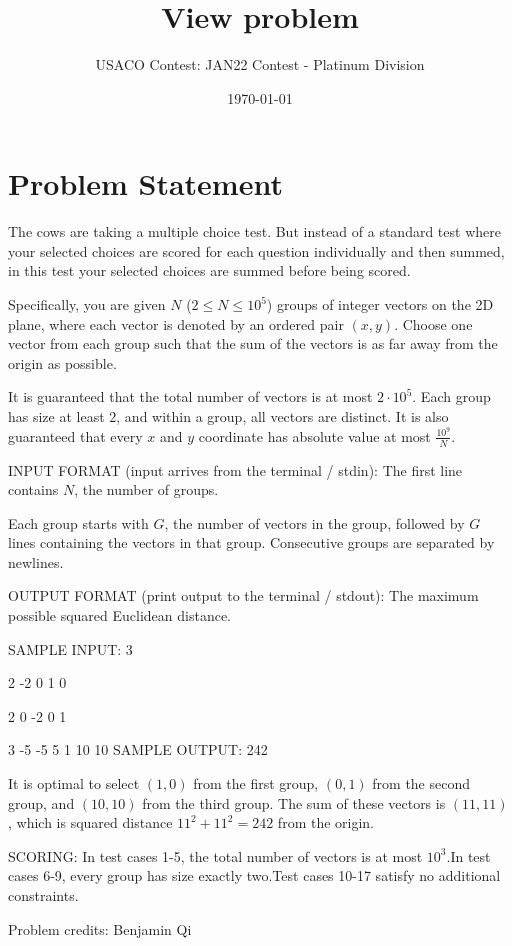 \documentclass[12pt]{article}
\title{View problem}
\author{USACO Contest: JAN22 Contest - Platinum Division}
\date{\today}
\begin{document}
\maketitle

\section*{Problem Statement}

The cows are taking a multiple choice test. But instead of a standard test where your
selected choices are scored for each question individually and then summed, in
this test your selected choices are summed before being scored.

Specifically, you are given $N$ ($2\le N\le 10^5$) groups of integer vectors  on
the 2D plane, where each vector is denoted by an ordered pair $(x,y)$. Choose
one vector from each group such that the sum of the vectors is as far away from
the origin as possible.

It is guaranteed that the total number of vectors is at most $2\cdot 10^5$. 
Each group has size at least $2$, and within a group, all vectors are distinct. 
It is also guaranteed that every $x$ and $y$ coordinate has absolute value at
most $\frac{10^9}{N}$.

INPUT FORMAT (input arrives from the terminal / stdin):
The first line contains $N$, the number of groups.

Each group starts with $G$, the number of vectors in the group, followed by $G$
lines containing the vectors in that group. Consecutive groups are separated by
newlines.

OUTPUT FORMAT (print output to the terminal / stdout):
The maximum possible squared Euclidean distance.

SAMPLE INPUT:
3

2
-2 0
1 0

2
0 -2
0 1

3
-5 -5
5 1
10 10
SAMPLE OUTPUT: 
242

It is optimal to select $(1,0)$ from the first group, $(0,1)$ from the second
group, and $(10,10)$ from the third group. The sum of these vectors is
$(11,11)$, which is squared distance $11^2+11^2=242$ from the origin.

SCORING:
In test cases 1-5, the total number of vectors is at most $10^3$.In test cases 6-9, every group has size exactly two.Test cases 10-17 satisfy no additional constraints.


Problem credits: Benjamin Qi
\end{document}
